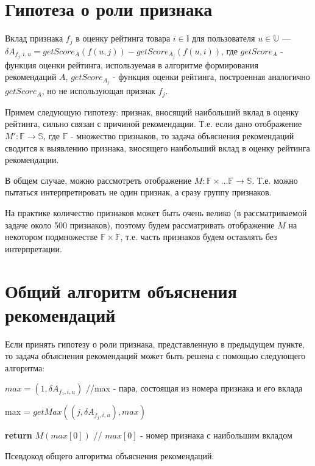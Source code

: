 \documentclass[12pt,a4paper]{report}
\begin{document}
\section{Гипотеза о роли признака}
\begin{Def}
Вклад признака $f_j$ в оценку рейтинга товара $i \in \mathbb{I}$ для пользователя $u \in \mathbb{U}$ --- $\delta A_{f_j,i,u} = getScore_A(f(u, j)) - getScore_{A_j}(f(u, i))$, где $getScore_A$ - функция оценки рейтинга, используемая в алгоритме формирования рекомендаций $A$, $getScore_{A_j}$ - функция оценки рейтинга, построенная аналогично $getScore_{A}$, но не использующая признак $f_j$.
\end{Def}
Примем следующую гипотезу: признак, вносящий наибольший вклад в оценку рейтинга, сильно связан с причиной рекомендации.
Т.е. если дано отображение $M': \mathbb{F} \to \mathbb{S}$, где $\mathbb{F}$ - множество признаков, то задача объяснения рекомендаций сводится к выявлению признака, вносящего наибольший вклад в оценку рейтинга рекомендации.

В общем случае, можно рассмотреть отображение $M: \mathbb{F} \times \dots \mathbb{F} \to \mathbb{S}$. Т.е. можно пытаться интерпретировать не один признак, а сразу группу признаков.

На практике количество признаков может быть очень велико (в рассматриваемой задаче около 500 признаков), поэтому будем рассматривать отображение $M$ на некотором подмножестве $\mathbb{F} \times \mathbb{F}$, т.е. часть признаков будем оставлять без интерпретации.

\section{Общий алгоритм объяснения рекомендаций}
Если принять гипотезу о роли признака, представленную в предыдущем пункте, то задача объяснения рекомендаций может быть решена с помощью следующего алгоритма:


\begin{algorithm}[H]
\SetAlgoLined
{}

$max = (1, \delta A_{f_1, i, u})$ //max - пара, состоящая из номера признака и его вклада

 {
	
	max = $getMax((j, \delta A_{f_j, i, u}), max)$
	
}
\textbf{return} $M(max[0])$ // $max[0]$ - номер признака с наибольшим вкладом

\caption{Псевдокод общего алгоритма объяснения рекомендаций.}
\label{alg:GENERALENT}
\end{algorithm}
\end{document}
